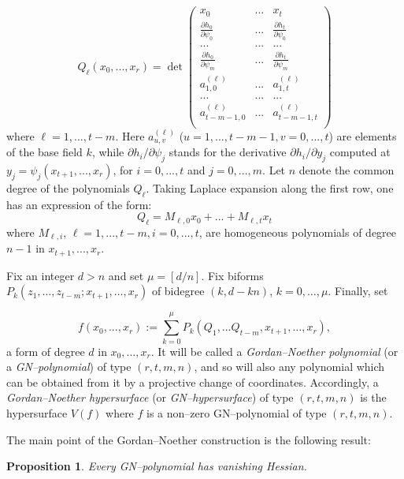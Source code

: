 \documentclass[11pt]{article}   %
\newtheorem{Proposition}[Theorem]{Proposition}
\theoremstyle{definition}
\numberwithin{Theorem}{section} \numberwithin{equation}{section}
\begin{document}
{$$
Q_\ell(x_0,...,x_r)=\det \left (
\begin{matrix}
x_0&...&x_t \\
\frac {\partial h_0}{\partial \psi_0}&...&\frac {\partial h_t}{\partial \psi_0}\\
... & ...& ... \\
\frac {\partial h_0}{\partial \psi_m}&...&\frac {\partial h_t}{\partial
\psi_m}\\[5pt]
a^ {(\ell)}_{1,0}&...&a^ {(\ell)}_{1,t} \\
... & ...& ... \\
a^ {(\ell)}_{t-m-1,0}&...&a^ {(\ell)}_{t-m-1,t} \\
\end{matrix}
\right)
$$
where ${\ell}=1,...,t-m$. Here $a^ {(\ell)}_{u,v}$ ($u=1,...,t-m-1,
v=0,...,t$) are elements of the base field $k$, while ${\partial
h_i}/{\partial \psi_j}$ stands for the derivative ${\partial
h_i}/{\partial y_j}$ computed at $y_j=\psi_j(x_{t+1},...,x_r)$, for
$i=0,...,t$ and $j=0,...,m$. Let $n$ denote the common degree of the
polynomials $Q_\ell$. Taking Laplace expansion along the first row,
one has an expression of the form:
$$Q_\ell=M_{\ell,0} x_0+...+M_{\ell,t}x_t$$
where $M_{\ell,i}$, ${\ell}=1,...,t-m, i=0,...,t$, are homogeneous
polynomials of degree $n-1$ in $x_{t+1},...,x_r$.


Fix an integer $d>n$ and set $\mu=[d/n]$. Fix biforms
$P_k(z_1,\ldots,z_{t-m};x_{t+1},\ldots,x_r)$ of bidegree $(k,d-kn)$,
$k=0,\ldots,\mu$. Finally, set

\begin{equation}\label{GNexpression}
f(x_0,...,x_r):=\sum_{k=0}^ \mu P_k(Q_1,\ldots Q_{t-m},x_{t+1},\ldots,x_r),
\end{equation}
a form of degree $d$ in $x_0,...,x_r$. It will be called a {\it
Gordan--Noether polynomial\/} (or a {\it {\rm GN}--polynomial\/}) of
type $(r,t,m,n)$,  and so will also any polynomial which can be
obtained from it by a projective change of coordinates. Accordingly,
a {\it Gordan--Noether hypersurface\/} (or {\it {\rm
GN}--hypersurface\/}) of type $(r,t,m,n)$ is the hypersurface $V(f)$
where $f$ is a non--zero GN--polynomial of type $(r,t,m,n)$.

\medskip

The main point of the Gordan--Noether construction is the following
result:

\begin{Proposition}\label {GNvanhess} Every {\rm GN}--polynomial has vanishing
Hessian.  \end{Proposition}

}
\end{document}
